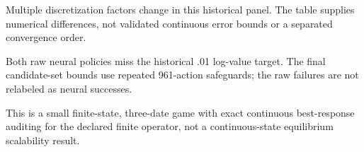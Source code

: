 \documentclass[ecta]{econsocart}
\renewcommand{\[}{\begingroup\small\ROpenDisplay}
\renewcommand{\]}{\RCloseDisplay\endgroup}
\theoremstyle{remark}
\begin{document}
\begin{table}[htbp]\centering\small
\caption{Retained R5 coupled NDU refinements}

\par\smallskip\footnotesize Multiple discretization factors change in this historical panel. The table supplies numerical differences, not validated continuous error bounds or a separated convergence order.
\end{table}

\begin{table}[htbp]\centering\small
\caption{Retained R5 recursive-utility policies}

\par\smallskip\footnotesize Both raw neural policies miss the historical .01 log-value target. The final candidate-set bounds use repeated 961-action safeguards; the raw failures are not relabeled as neural successes.
\end{table}

\begin{table}[htbp]\centering\small
\caption{Retained R5 neural game}

\par\smallskip\footnotesize This is a small finite-state, three-date game with exact continuous best-response auditing for the declared finite operator, not a continuous-state equilibrium scalability result.
\end{table}
\clearpage

\end{document}
